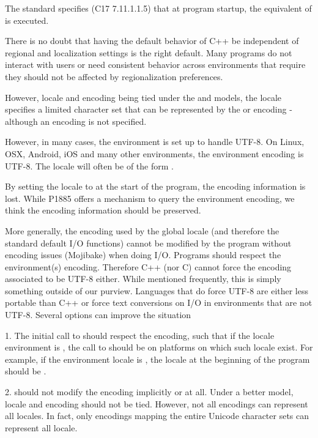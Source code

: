 \documentclass{wg21}
\begin{document}
The \cite{C} standard specifies (C17 7.11.1.1.5) that
at program startup, the equivalent of  is executed.

There is no doubt that having the default behavior of C++ be independent of regional and localization settings is the right default.
Many programs do not interact with users or need consistent behavior across environments that require they should not be affected by regionalization preferences.

However, locale and encoding being tied under the  and  models,
the  locale specifies a limited character set that can be represented by the  or  encoding - although an encoding is not specified.

However, in many cases, the environment is set up to handle UTF-8.
On Linux, OSX, Android, iOS and many other environments, the environment encoding is UTF-8. The locale will often be of the form .

By setting the locale to  at the start of the program, the encoding information is lost.
While P1885 \cite{P1885R0} offers a mechanism to query the environment encoding, we think the encoding information should be preserved.

More generally, the encoding used by the global locale (and therefore the standard default I/O functions) cannot be modified by the program without encoding issues (Mojibake) when doing I/O.
Programs should respect the environment(s) encoding.
Therefore C++ (nor C) cannot force the encoding associated to be UTF-8 either. 
While mentioned frequently, this is simply something outside of our purview.
Languages that do force UTF-8 are either less portable than C++ or force text conversions on I/O in environments that are not UTF-8.
Several options can improve the situation

1.  The initial call to  should respect the encoding, such that if the locale environment is , the call to  should be  on platforms on which  such locale exist.
For example, if the environment locale is , the locale at the beginning of the program should be .

2.  should not modify the encoding implicitly or at all. Under a better model, locale and encoding should not be tied.
However, not all encodings can represent all locales.
In fact, only encodings mapping the entire Unicode character sets can represent all locale.
\end{document}
